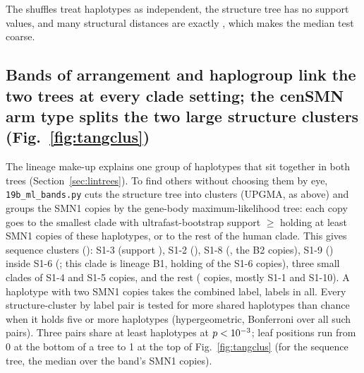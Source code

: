 The shuffles treat haplotypes as independent, the structure tree has no support values, and many structural
distances are exactly \tmMedAll, which makes the median test coarse.


\subsection{Bands of arrangement and haplogroup link the two trees at every clade setting; the cenSMN arm type splits the two large structure clusters (Fig.~\ref{fig:tangclus})}\label{sec:bands}
The lineage make-up explains one group of haplotypes that sit together in both trees (Section~\ref{sec:lintrees}). To find others without choosing them by
eye, \texttt{19b\_ml\_bands.py} cuts the structure tree into \setK{} clusters (UPGMA, as above) and groups the SMN1
copies by the gene-body maximum-likelihood tree: each copy goes to the smallest clade with ultrafast-bootstrap support
$\ge$\setMLsup{} holding at least \setMLmin{} SMN1 copies of these haplotypes, or to the rest of the human clade. This
gives \mlbClusters{} sequence clusters (): S1-3 (support \mlbThreeSup), S1-2
(\mlbTwoSup), S1-8 (\mlbEightSup, the B2 copies), S1-9 (\mlbNineSup) inside S1-6 (\mlbSixSup; this clade is lineage B1, holding \hgBoneSix{} of the \hgSixB{} S1-6 copies),
three small clades of S1-4 and S1-5 copies, and the rest (\mlbRestCopies{} copies, mostly S1-1 and S1-10). A haplotype
with two SMN1 copies takes the combined label, \mlbLabels{} labels in all. Every structure-cluster by label pair is
tested for more shared haplotypes than chance when it holds five or more haplotypes (hypergeometric, Bonferroni
over all such pairs). Three pairs share at least \mlbMinOv{} haplotypes at $p<10^{-3}$; leaf
positions run from 0 at the bottom of a tree to 1 at the top of Fig.~\ref{fig:tangclus} (for the sequence tree, the
median over the band's SMN1 copies).

